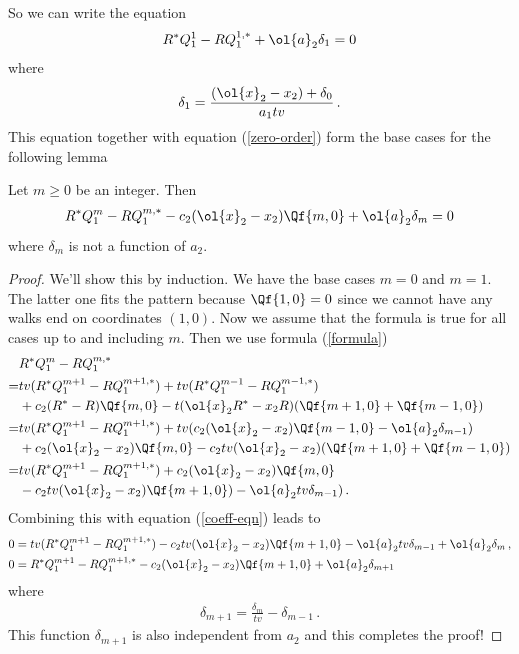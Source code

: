 So we can write the equation
\begin{align}
        R^\ast Q_1^1-R Q_1^{1,\ast}+ \ol{a}_2\delta_1 = 0
\end{align}
where
\begin{align}
   \delta_1 = \frac{(\ol{x}_2-x_2)+\delta_0}{a_1tv}\,.
\end{align}
This equation together with equation (\ref{zero-order}) form the base cases for the following lemma
\begin{lemma} Let $m\ge 0$ be an integer. Then
\begin{align}\label{coeff-eqn}
	R^\ast Q_1^m -R Q_1^{m,\ast} - c_2(\ol{x}_2-x_2)\Qf{m,0} + \ol{a}_2\delta_m = 0
\end{align}
where $\delta_m$ is not a function of $a_2$.
\end{lemma}
\begin{proof}We'll show this by induction. We have the base cases $m = 0$ and $m=1$. The latter one fits the pattern because $\Qf{1,0} = 0$ since we cannot have any walks end on coordinates $(1,0)$. Now we assume that the formula is true for all cases up to and including $m$. Then we use formula (\ref{formula})
\begin{align}
\begin{split}
	& R^\ast Q_1^m -R Q_1^{m,\ast}\\
	=&tv(R^\ast Q_1^{m+1}-R Q_1^{m+1,\ast}) + tv(R^\ast Q_1^{m-1}-R Q_1^{m-1,\ast})\\
	   & + c_2(R^\ast-R)\Qf{m,0}-t(\ol{x}_2R^\ast-x_2 R)(\Qf{m+1,0}+\Qf{m-1,0})\\
	=& tv(R^\ast Q_1^{m+1}-R Q_1^{m+1,\ast}) + tv(c_2(\ol{x}_2-x_2)\Qf{m-1,0}- \ol{a}_2\delta_{m-1})\\
	   & + c_2(\ol{x}_2-x_2)\Qf{m,0}-c_2tv(\ol{x}_2-x_2)(\Qf{m+1,0}+\Qf{m-1,0})\\
	=& tv(R^\ast Q_1^{m+1}-R Q_1^{m+1,\ast})+ c_2(\ol{x}_2-x_2)\Qf{m,0}\\
	   &-c_2tv(\ol{x}_2-x_2)\Qf{m+1,0}) -  \ol{a}_2tv\delta_{m-1})\,.
\end{split}
\end{align}
Combining this with equation (\ref{coeff-eqn}) leads to
\begin{align}
	0 &= tv(R^\ast Q_1^{m+1}-R Q_1^{m+1,\ast})-c_2tv(\ol{x}_2-x_2)\Qf{m+1,0} -  \ol{a}_2tv\delta_{m-1} + \ol{a}_2\delta_m\,, \\
	0 & = R^\ast Q_1^{m+1}-R Q_1^{m+1,\ast}-c_2(\ol{x}_2-x_2)\Qf{m+1,0}+  \ol{a}_2\delta_{m+1}
\end{align}
where
\begin{align}
  \delta_{m+1} =\frac{\delta_m}{tv}-\delta_{m-1}\,.
\end{align}
This function $\delta_{m+1}$ is also independent from $a_2$ and this completes the proof!
\end{proof}
